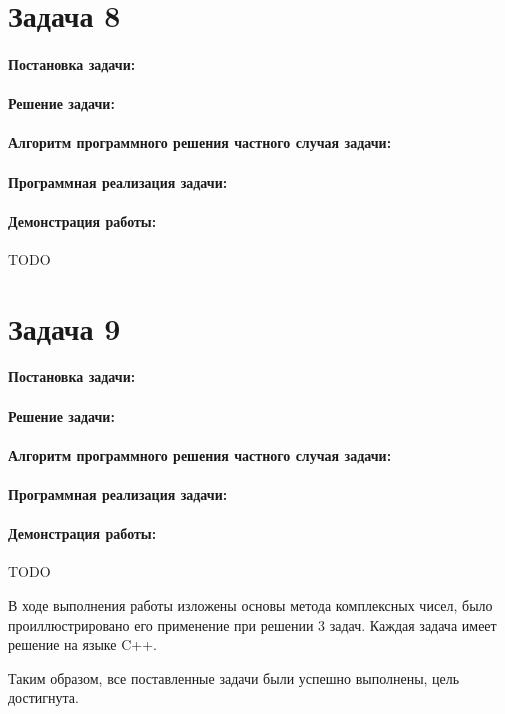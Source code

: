 {
   \section*{Задача 8}
   \paragraph{Постановка задачи:}
   \paragraph{Решение задачи:}
   \paragraph{Алгоритм программного решения частного случая задачи:}
   \paragraph{Программная реализация задачи:}
   \paragraph{Демонстрация работы:}
   TODO %
}{
   \section*{Задача 9}
   \paragraph{Постановка задачи:}
   \paragraph{Решение задачи:}
   \paragraph{Алгоритм программного решения частного случая задачи:}
   \paragraph{Программная реализация задачи:}
   \paragraph{Демонстрация работы:}
   TODO %
}
В ходе выполнения работы изложены основы метода комплексных чисел, было проиллюстрировано его применение при решении 3 задач. Каждая задача имеет решение на языке C++.


Таким образом, все поставленные задачи были успешно выполнены, цель
достигнута.




